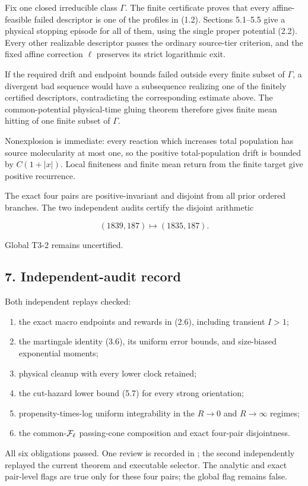 Fix one closed irreducible class \(\Gamma\). The finite certificate
proves that every affine-feasible failed descriptor is one of the
profiles in (1.2). Sections 5.1--5.5 give a physical stopping episode
for all of them, using the single proper potential (2.2). Every other
realizable descriptor passes the ordinary source-tier criterion, and the
fixed affine correction \(\ell\) preserves its strict logarithmic exit.

If the required drift and endpoint bounds failed outside every finite
subset of \(\Gamma\), a divergent bad sequence would have a subsequence
realizing one of the finitely certified descriptors, contradicting the
corresponding estimate above. The common-potential physical-time gluing
theorem therefore gives finite mean hitting of one finite subset of
\(\Gamma\).

Nonexplosion is immediate: every reaction which increases total
population has source molecularity at most one, so the positive
total-population drift is bounded by \(C(1+|x|)\). Local finiteness and
finite mean return from the finite target give positive recurrence.

The exact four pairs are positive-invariant and disjoint from all prior
ordered branches. The two independent audits certify the disjoint
arithmetic

\[
 (1839,187)\longmapsto(1835,187).                      \tag{6.1}
\]

Global T3-2 remains uncertified.

\subsection{7. Independent-audit record}

Both independent replays checked:

\begin{enumerate}
\def\labelenumi{\arabic{enumi}.}
\tightlist
\item
  the exact macro endpoints and rewards in (2.6), including transient
  \(I>1\);
\item
  the martingale identity (3.6), its uniform error bounds, and
  size-biased exponential moments;
\item
  physical cleanup with every lower clock retained;
\item
  the cut-hazard lower bound (5.7) for every strong orientation;
\item
  propensity-times-log uniform integrability in the \(R\to0\) and
  \(R\to\infty\) regimes;
\item
  the common-\({\cal F}_\ell\) passing-cone composition and exact
  four-pair disjointness.
\end{enumerate}

All six obligations passed. One review is recorded in
\texttt{};
the second independently replayed the current theorem and executable
selector. The analytic and exact pair-level flags are true only for
these four pairs; the global flag remains false.

